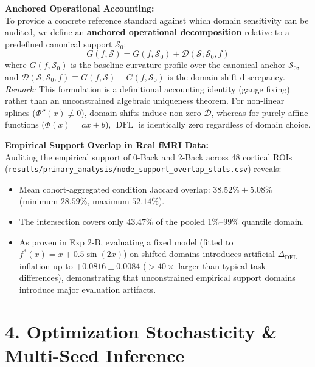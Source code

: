 \documentclass{article}
\begin{document}
\textbf{Anchored Operational Accounting:}\\
To provide a concrete reference standard against which domain sensitivity can be audited, we define an \textbf{anchored operational decomposition} relative to a predefined canonical support $\mathcal{S}_0$:
\begin{equation}
G(f, \mathcal{S}) = G(f, \mathcal{S}_0) + \mathcal{D}(\mathcal{S}; \mathcal{S}_0, f)
\end{equation}
where $G(f, \mathcal{S}_0)$ is the baseline curvature profile over the canonical anchor $\mathcal{S}_0$, and $\mathcal{D}(\mathcal{S}; \mathcal{S}_0, f) \equiv G(f, \mathcal{S}) - G(f, \mathcal{S}_0)$ is the domain-shift discrepancy. \\
\textit{Remark:} This formulation is a definitional accounting identity (gauge fixing) rather than an unconstrained algebraic uniqueness theorem. For non-linear splines ($\Phi''(x) \not\equiv 0$), domain shifts induce non-zero $\mathcal{D}$, whereas for purely affine functions ($\Phi(x) = ax + b$), $\operatorname{DFL}$ is identically zero regardless of domain choice.

\textbf{Empirical Support Overlap in Real fMRI Data:}\\
Auditing the empirical support of 0-Back and 2-Back across 48 cortical ROIs (\texttt{results/primary\_analysis/node\_support\_overlap\_stats.csv}) reveals:
\begin{itemize}
    \item Mean cohort-aggregated condition Jaccard overlap: \textbf{$38.52\% \pm 5.08\%$} (minimum $28.59\%$, maximum $52.14\%$).
    \item The intersection covers only \textbf{$43.47\%$} of the pooled 1\%--99\% quantile domain.
    \item As proven in Exp 2-B, evaluating a fixed model (fitted to $f^*(x) = x + 0.5\sin(2x)$) on shifted domains introduces artificial $\Delta_{\mathrm{DFL}}$ inflation up to \textbf{$+0.0816 \pm 0.0084$} ($>40\times$ larger than typical task differences), demonstrating that unconstrained empirical support domains introduce major evaluation artifacts.
\end{itemize}

\section*{4. Optimization Stochasticity \& Multi-Seed Inference}
\end{document}
